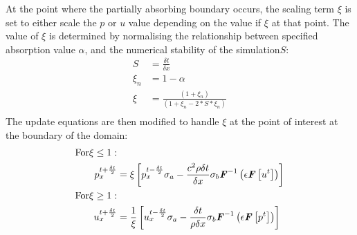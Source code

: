 At the point where the partially absorbing boundary occurs, the scaling term $\xi$ is set to either scale the $p$ or $u$ value depending on the value if $\xi$ at that point. The value of $\xi$ is determined by normalising the relationship between specified absorption value $\alpha$, and the numerical stability of the simulation$S$:\\
\begin{equation}
\begin{aligned}
S & = \frac{\delta t}{\delta x} \\
\xi_n & = 1 - \alpha \\
\xi & = \frac{(1 + \xi_n)}{(1 + \xi_n - 2 * S * \xi_n)}\\
\end{aligned}
\end{equation}
The update equations are then modified to handle $\xi$ at the point of interest at the boundary of the domain:\\
\begin{equation}
\begin{aligned}
\textrm{For} \xi \leq 1: & \\
p^{t + \frac{\delta t}{2}}_{x} &= \xi \left[ p^{t - \frac{\delta t}{2}}_{x} \sigma_a - \frac{c^2 \rho \delta t}{\delta x} \sigma_b \textbf{\textit{F}}^{-1}\left( \epsilon \textbf{\textit{F}} \left[ u^{t} \right] \right) \right] \\
\textrm{For} \xi \geq 1: & \\
u^{t + \frac{\delta t}{2}}_{x} &= \frac{1}{\xi} \left[ u^{t - \frac{\delta t}{2}}_{x} \sigma_a - \frac{\delta t}{\rho \delta x} \sigma_b \textbf{\textit{F}}^{-1}\left(\epsilon \textbf{\textit{F}}\left[p^{t}\right] \right) \right] \\
\end{aligned}
\end{equation}


